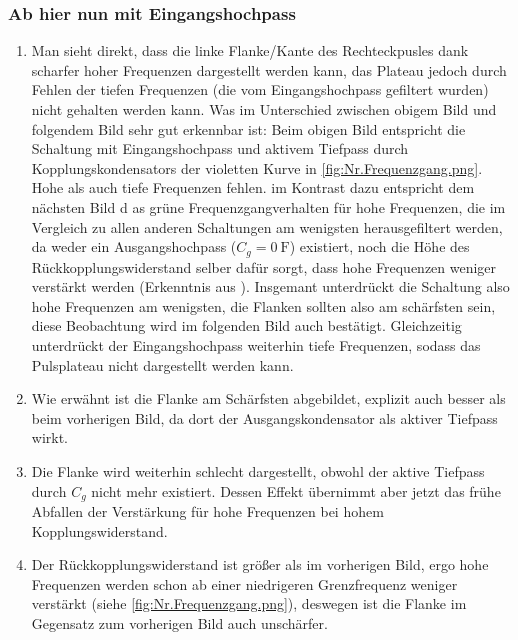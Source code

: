 \subsubsection*{Ab hier nun mit Eingangshochpass}
\begin{enumerate}[resume]
\FloatBarrier
\item Man sieht direkt, dass die linke Flanke/Kante des Rechteckpusles dank scharfer hoher Frequenzen dargestellt werden kann, das Plateau jedoch durch Fehlen der tiefen Frequenzen (die vom Eingangshochpass gefiltert wurden) nicht gehalten werden kann. Was im Unterschied zwischen obigem Bild und folgendem Bild sehr gut erkennbar ist: Beim obigen Bild entspricht die Schaltung mit Eingangshochpass und aktivem Tiefpass durch Kopplungskondensators der violetten Kurve in \cref{fig:Nr.Frequenzgang.png}. Hohe als auch tiefe Frequenzen fehlen. im Kontrast dazu entspricht dem nächsten Bild d as grüne Frequenzgangverhalten für hohe Frequenzen, die im Vergleich zu allen anderen Schaltungen am wenigsten herausgefiltert werden, da weder ein Ausgangshochpass (\(C_g=\qty{0}{\farad}\)) existiert, noch die Höhe des Rückkopplungswiderstand selber dafür sorgt, dass hohe Frequenzen weniger verstärkt werden (Erkenntnis aus ). Insgemant unterdrückt die Schaltung also hohe Frequenzen am wenigsten, die Flanken sollten also am schärfsten sein, diese Beobachtung wird im folgenden Bild auch bestätigt. Gleichzeitig unterdrückt der Eingangshochpass weiterhin tiefe Frequenzen, sodass das Pulsplateau nicht dargestellt werden kann.
\FloatBarrier
\item Wie erwähnt ist die Flanke am Schärfsten abgebildet, explizit auch besser als beim vorherigen Bild, da dort der Ausgangskondensator als aktiver Tiefpass wirkt.
\FloatBarrier
\item Die Flanke wird weiterhin schlecht dargestellt, obwohl der aktive Tiefpass durch \(C_g\) nicht mehr existiert. Dessen Effekt übernimmt aber jetzt das frühe Abfallen der Verstärkung für hohe Frequenzen bei hohem Kopplungswiderstand. 
\FloatBarrier
\item Der Rückkopplungswiderstand ist größer als im vorherigen Bild, ergo hohe Frequenzen werden schon ab einer niedrigeren Grenzfrequenz weniger verstärkt (siehe \cref{fig:Nr.Frequenzgang.png}), deswegen ist die Flanke im Gegensatz zum vorherigen Bild auch unschärfer. 
\end{enumerate}


